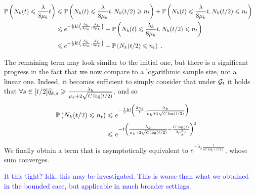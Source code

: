 \begin{align*}
\mathbb{P}\left(N_k(t)\leqslant \frac{\lambda}{8\mu_k}t\right) & \leqslant \mathbb{P}\left(N_k(t)\leqslant \frac{\lambda}{8\mu_k}t, N_k(t/2)\geqslant n_t\right) + \mathbb{P}\left(N_k(t)\leqslant \frac{\lambda}{8\mu_k}t, N_k(t/2)\leqslant n_t\right) \\
& \leqslant e^{-\frac{t}{2} \text{\normalfont kl}\left(\frac{\lambda_k}{4\mu_k}, \frac{\lambda_k}{2\mu_k}\right)} + \mathbb{P}\left(N_k(t)\leqslant \frac{\lambda_k}{8\mu_k}t, N_k(t/2)\leqslant n_t\right) \\
&  \leqslant e^{-\frac{t}{2} \text{\normalfont kl}\left(\frac{\lambda_k}{4\mu_k}, \frac{\lambda_k}{2\mu_k}\right)} + \mathbb{P}\left(N_k(t/2)\leqslant n_t\right) \;.
\end{align*}

The remaining term may look similar to the initial one, but there is a significant progress in the fact that we now compare to a logarithmic sample size, not a linear one. Indeed, it becomes sufficient to simply consider that under $\mathcal{G}_t$ it holds that $\forall s \in [t/2] \widehat{q}_{k,s}\geqslant \frac{\lambda_k}{\mu_k + 2 \sqrt{C\log(t/2)}}$, and so 
\begin{align*}
\mathbb{P}\left(N_k(t/2)\leqslant n_t\right) & \leqslant e^{-\frac{t}{2}\text{\normalfont kl}\left(\frac{2 n_t}{t}, \frac{\lambda_k}{\mu_k + 2 \sqrt{C\log(t/2)}} \right)} \\
& \leqslant e^{-t \left(\frac{\lambda_k}{\mu_k + 2 \sqrt{C\log(t/2)}}- \frac{C\log(t)}{2\mu_k^2t}\right)^2}\;.
\end{align*}
We finally obtain a term that is asymptotically equivalent to $e^{-\lambda_k\frac{t}{4C\log(t/2)}}$, whose sum converges.

\textcolor{blue}{It this tight? Idk, this may be investigated. This is worse than what we obtained in the bounded case, but applicable in much broader settings.}